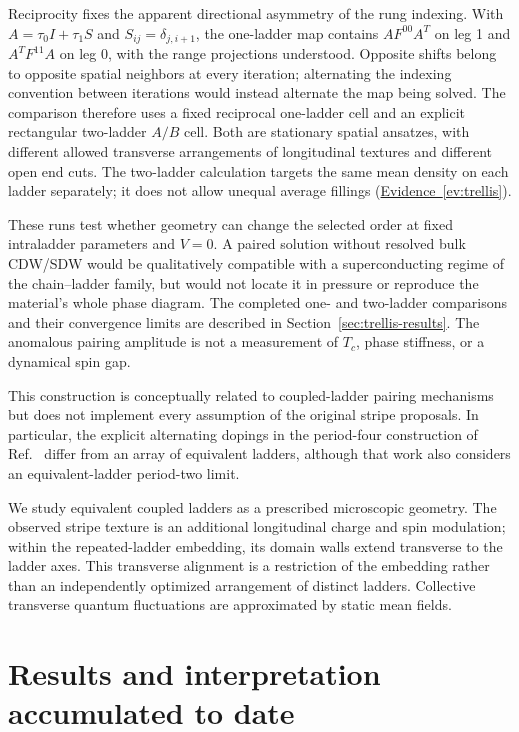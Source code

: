 \documentclass[11pt,letterpaper]{article}
\newcommand{\ev}[1]{\hyperref[ev:#1]{Evidence~\ref*{ev:#1}}}
\begin{document}
Reciprocity fixes the apparent directional asymmetry of the rung indexing.
With $A=\tau_0 I+\tau_1 S$ and $S_{ij}=\delta_{j,i+1}$, the one-ladder
map contains $A F^{00}A^T$ on leg 1 and $A^T F^{11}A$ on leg 0, with the
range projections understood. Opposite shifts belong to opposite spatial
neighbors at every iteration; alternating the indexing convention between
iterations would instead alternate the map being solved. The comparison
therefore uses a fixed reciprocal one-ladder cell and an explicit rectangular
two-ladder $A/B$ cell. Both are stationary spatial ansatzes, with different
allowed transverse arrangements of longitudinal textures and different open
end cuts. The two-ladder calculation targets the same mean density on each
ladder separately; it does not allow unequal average fillings (\ev{trellis}).

These runs test whether geometry can change the selected order at fixed
intraladder parameters and $V=0$. A paired solution without resolved bulk
CDW/SDW would be qualitatively compatible with a superconducting regime of
the chain--ladder family, but would not locate it in pressure or reproduce
the material's whole phase diagram. The completed one- and two-ladder
comparisons and their convergence limits are described in
Section~\ref{sec:trellis-results}. The anomalous pairing amplitude is not a
measurement of $T_c$, phase stiffness, or a dynamical spin gap.

This construction is conceptually related to coupled-ladder pairing
mechanisms but does not implement every assumption of the original stripe
proposals. In particular, the explicit alternating dopings in the period-four
construction of Ref.~\citep{Arrigoni2004} differ from an array of equivalent
ladders, although that work also considers an equivalent-ladder period-two
limit.

We study equivalent coupled ladders as a prescribed microscopic geometry.
The observed stripe texture is an additional longitudinal charge and spin
modulation; within the repeated-ladder embedding, its domain walls extend
transverse to the ladder axes. This transverse alignment is a restriction
of the embedding rather than an independently optimized arrangement of
distinct ladders. Collective transverse quantum fluctuations are
approximated by static mean fields.

\section{Results and interpretation accumulated to date}
\label{sec:results}
\end{document}
